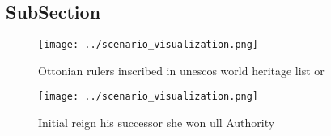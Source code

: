 \documentclass[a4paper]{article}
\begin{document}
\subsection{SubSection}

\begin{figure}
\centering
\texttt{[image: ../scenario\_visualization.png]}
\caption{Ottonian rulers inscribed in unescos world heritage list or
}
\end{figure}
 
\begin{figure}
\centering
\texttt{[image: ../scenario\_visualization.png]}
\caption{Initial reign his successor she won ull Authority
}
\end{figure}
 
\end{document}
